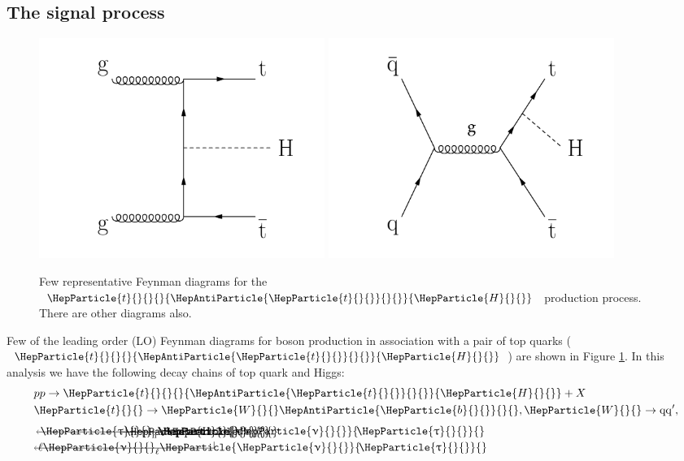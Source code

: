 \documentclass[12pt, a4paper]{article}
\DeclareRobustCommand{\PW}{{\HepParticle{W}{}{}}\xspace}
\DeclareRobustCommand{\PH}{{\HepParticle{H}{}{}}\xspace}
\DeclareRobustCommand{\PQb}{{\HepParticle{b}{}{}}\xspace} %
\DeclareRobustCommand{\PQt}{\HepParticle{t}{}{}} %
\DeclareRobustCommand{\PAQb}{{\HepAntiParticle{\PQb}{}{}}\xspace} %
\DeclareRobustCommand{\PAQt}{{\HepAntiParticle{\PQt}{}{}}\xspace} %
\DeclareRobustCommand{\PGt}{{\HepParticle{\uptau}{}{}}\xspace} %
\DeclareRobustCommand{\PGn}{{\HepParticle{\upnu}{}{}}\xspace} %
\DeclareRobustCommand{\PGnGt}{{\HepParticle{\PGn}{\!\PGt}{}}\xspace} %
\newcommand{\ttbar}{\PQt{}\PAQt} %
\newcommand{\tauh}{\ensuremath{\PGt_\mathrm{h}}\xspace}
\newcommand{\ttH}{\ttbar\PH}
\begin{document}
\subsection{The signal process}
\begin{figure}[!htb]
	\centering
	\includegraphics[width=0.45\textwidth]{Fig/ttH_Feynman_1.pdf}
	\includegraphics[width=0.45\textwidth]{Fig/ttH_Feynman_2.pdf}
	\caption{Few representative Feynman diagrams for the $\ttH$ production process. There are other diagrams also.}
	\label{ttH_feynman}
\end{figure}
Few of the leading order (LO) Feynman diagrams for \PH boson production in association with a pair
of top quarks ($\ttH$) are shown in Figure \ref{ttH_feynman}. In this analysis we have the following decay chains of top quark and Higgs:\\
\begin{equation}
\begin{split}
	&pp \to\ttH+X\\
	&\PQt \to\PW\PAQb, \PW\to \mathrm{qq'},\\
	&\begin{tikzpicture}[node distance=0.5cm]
	\node (A) at (0, 2) {\PH};
	\node (B) at (1, 2) {$\PGt$};
	\node (E) at (1.25, 2) {$\PGt$};
	\node (C) at (2.5, 2) {$\tauh\PGnGt$};
	\node (D) at (2.5, 1.5) {$\ell\PGn_{\ell}\PGnGt$};
	\draw[->] (A) -- (B);
	\draw[->] (E) -- (C);
	\draw[->, to path={|- (\tikztotarget)}]
	(B) edge (D);
	\end{tikzpicture}
\end{split}
\end{equation}
\end{document}

